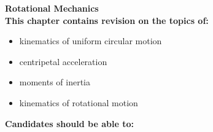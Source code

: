 \documentclass{article}
\begin{document}
	\normalsize

\Large 
\bf Rotational Mechanics
\normalfont
\normalsize
\\



This chapter contains revision on the topics of:

\begin {itemize}
\item  kinematics of uniform circular motion

\item centripetal acceleration

\item moments of inertia

\item kinematics of rotational motion

\end {itemize}

\bf Candidates should be able to:
\normalfont
\end{document}
